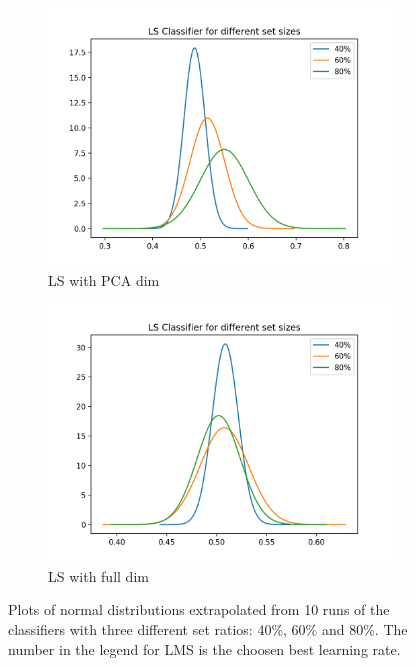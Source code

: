 \documentclass[12pt, a4paper]{article}
\begin{document}
\begin{figure}[H]
\begin{subfigure}{0.3\textwidth}
        \includegraphics[width=\textwidth]{recursos/1/ls_pca}
         \caption{LS with PCA dim}
    \end{subfigure}
    \begin{subfigure}{0.3\textwidth}
        \includegraphics[width=\textwidth]{recursos/1/ls_full}
        \caption{LS with full dim}
    \end{subfigure}
    \caption{ Plots of normal distributions extrapolated from 10 runs of the classifiers with three different set ratios: 40\%, 60\% and 80\%. The number in the legend for LMS is the choosen best learning rate. }
\end{figure}
\end{document}
